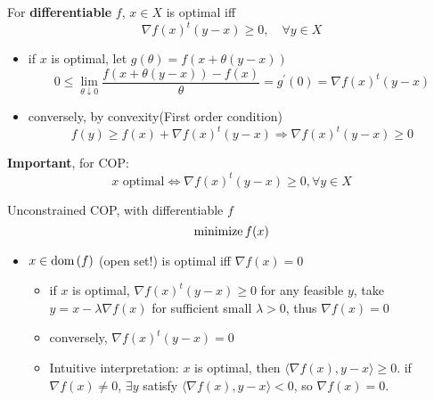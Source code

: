 \begin{remark}
    For \textbf{differentiable} $f$, $x \in X$ is optimal iff \[\nabla f(x)^t(y - x) \ge 0, \quad \forall y \in X\]
    \begin{itemize}
        \item if $x$ is optimal, let  $g(\theta) = f(x + \theta(y - x))$ \[0 \leq \lim _{\theta \downarrow 0} \frac{f(x+\theta(y-x))-f(x)}{\theta}=g^{\prime}(0)=\nabla f(x)^{t}(y-x)\]
        \item conversely, by convexity(First order condition) \[f(y) \ge f(x) + \nabla f(x)^t(y - x) \Longrightarrow \nabla f(x)^t(y - x) \ge 0\]
    \end{itemize}
    \textbf{Important}, for COP:\[x \text{ optimal} \Longleftrightarrow \nabla f(x)^t(y - x) \ge 0, \forall y \in X\]
\end{remark}

\begin{remark}
    Unconstrained COP, with differentiable $f$ \[\operatorname{minimize}{f(x)}\]
    \begin{itemize}
        \item $x \in \operatorname{dom}{(f)}$ (open set!) is optimal iff $\nabla f(x) = 0$ \begin{itemize}
            \item if $x$ is optimal, $\nabla f(x)^t(y - x) \ge 0$ for any feasible $y$, take $y = x - \lambda \nabla f(x)$ for sufficient small $\lambda > 0$, thus $\nabla f(x) = 0$
            \item conversely, $\nabla f(x)^t(y - x) = 0$
            \item Intuitive interpretation: $x$ is optimal, then $\langle\nabla f(x), y - x\rangle \ge 0$. if $\nabla f(x) \neq 0$, $\exists y$ satisfy $\langle\nabla f(x), y - x\rangle < 0$, so $\nabla f(x) = 0$.
        \end{itemize}
    \end{itemize}
\end{remark}

